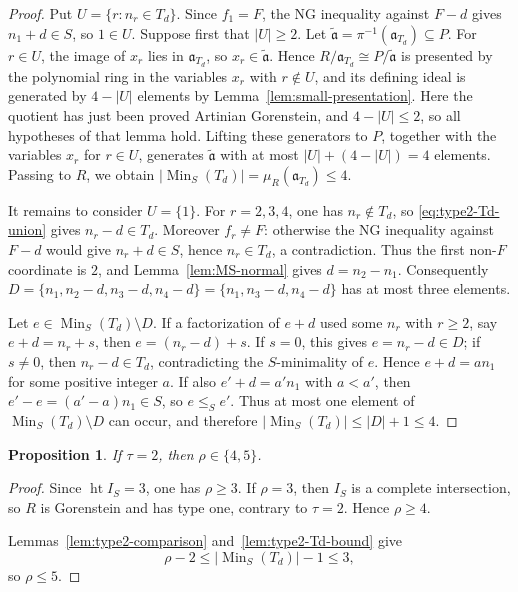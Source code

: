 \documentclass[10pt]{amsart}
\theoremstyle{plain}
\newtheorem{proposition}[lemma]{Proposition}
\begin{document}
\begin{proof}
Put \(U=\{r:n_r\in T_d\}\).  Since \(f_1=F\), the NG inequality
against \(F-d\) gives \(n_1+d\in S\), so \(1\in U\).
Suppose first that \(|U|\ge2\).  Let
\(\widetilde{\mathfrak a}=\pi^{-1}(\mathfrak a_{T_d})\subseteq P\).
For \(r\in U\), the image of \(x_r\) lies in \(\mathfrak a_{T_d}\), so
\(x_r\in\widetilde{\mathfrak a}\).  Hence
\(R/\mathfrak a_{T_d}\cong P/\widetilde{\mathfrak a}\) is presented by
the polynomial ring in the variables \(x_r\) with \(r\notin U\), and
its defining ideal is generated by \(4-|U|\) elements by
Lemma~\ref{lem:small-presentation}.  Here the quotient has just been
proved Artinian Gorenstein, and \(4-|U|\le2\), so all hypotheses of
that lemma hold.  Lifting these generators to \(P\), together with the
variables \(x_r\) for \(r\in U\), generates
\(\widetilde{\mathfrak a}\) with at most
\(|U|+(4-|U|)=4\) elements.  Passing to \(R\), we obtain
\(|\operatorname{Min}_S(T_d)|
=\mu_R(\mathfrak a_{T_d})\le4\).

It remains to consider \(U=\{1\}\).  For \(r=2,3,4\), one has
\(n_r\notin T_d\), so \eqref{eq:type2-Td-union} gives
\(n_r-d\in T_d\).  Moreover \(f_r\ne F\): otherwise the NG inequality
against \(F-d\) would give \(n_r+d\in S\), hence \(n_r\in T_d\), a
contradiction.  Thus the first non-\(F\) coordinate is \(2\), and
Lemma~\ref{lem:MS-normal} gives \(d=n_2-n_1\).  Consequently
\(D=\{n_1,n_2-d,n_3-d,n_4-d\}
=\{n_1,n_3-d,n_4-d\}\) has at most three elements.

Let \(e\in\operatorname{Min}_S(T_d)\setminus D\).
If a factorization of \(e+d\) used some \(n_r\) with \(r\ge2\), say
\(e+d=n_r+s\), then \(e=(n_r-d)+s\).
If \(s=0\), this gives \(e=n_r-d\in D\); if \(s\ne0\), then
\(n_r-d\in T_d\), contradicting the \(S\)-minimality of \(e\).
Hence \(e+d=a n_1\) for some positive integer \(a\).
If also \(e'+d=a'n_1\) with \(a<a'\), then
\(e'-e=(a'-a)n_1\in S\), so \(e\le_S e'\).
Thus at most one element of
\(\operatorname{Min}_S(T_d)\setminus D\) can occur, and therefore
\(|\operatorname{Min}_S(T_d)|\le |D|+1\le4\).
\end{proof}

\begin{proposition}\label{prop:type2}
If \(\tau=2\), then \(\rho\in\{4,5\}\).
\end{proposition}

\begin{proof}
Since \(\operatorname{ht} I_S=3\), one has \(\rho\ge3\).
If \(\rho=3\), then \(I_S\) is a complete intersection, so \(R\) is
Gorenstein and has type one, contrary to \(\tau=2\).  Hence \(\rho\ge4\).

Lemmas~\ref{lem:type2-comparison} and~\ref{lem:type2-Td-bound} give
\[
\rho-2\le |\operatorname{Min}_S(T_d)|-1\le3,
\]
so \(\rho\le5\).
\end{proof}
\end{document}
